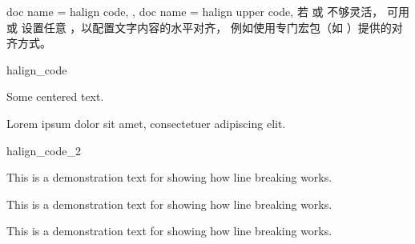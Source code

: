 \begin{docTcbKeys}[
    doc parameter   = {=\marg{code}},
    doc description = {无默认值},
    doc new         = 2022-07-07,
  ]
  {
    {
      doc name = halign code,
    },
    {
      doc name = halign upper code,
    }
  }
  若  或  不够灵活，
  可用  或 
  设置任意 ，以配置文字内容的水平对齐，
  例如使用专门宏包（如 ）提供的对齐方式。

\begin{exdispExample}{halign_code}
\begin{tcolorbox}[colback=red!5!white,colframe=red!75!black,halign=center]
  Some centered text.
  \begin{tcolorbox}[colback=blue!5!white,colframe=blue!75!black,width=5cm,
      halign code=\noindent\justifying]
    Lorem ipsum dolor sit amet, consectetuer adipiscing elit.
  \end{tcolorbox}
\end{tcolorbox}
\end{exdispExample}

\begin{exdispExample}{halign_code_2}

\begin{tcolorbox}[adjusted title=Centering,halign code=\Centering]
This is a demonstration text for showing how line breaking works.
\end{tcolorbox}
\begin{tcolorbox}[adjusted title=RaggedRight,halign code=\RaggedRight]
This is a demonstration text for showing how line breaking works.
\end{tcolorbox}
\begin{tcolorbox}[adjusted title=RaggedLeft,halign code=\RaggedLeft]
This is a demonstration text for showing how line breaking works.
\end{tcolorbox}
\end{exdispExample}

\end{docTcbKeys}


